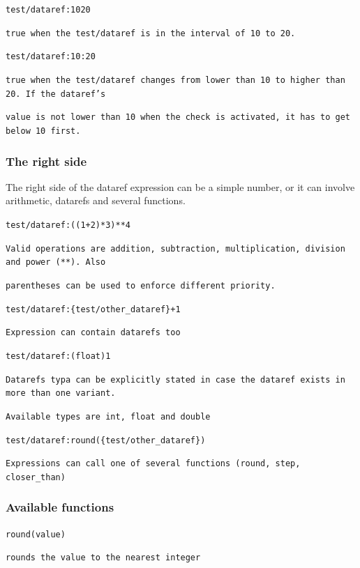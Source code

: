 \documentclass[11pt,parskip=half,a4paper]{scrartcl}
\newcommand\textstyleSourceText[1]{\texttt{#1}}
\begin{document}
\textstyleSourceText{test/dataref:10{\textbar}20}

{\ttfamily
\textstyleSourceText{true when the {\textquotedbl}test/dataref{\textquotedbl} is in the interval of 10 to 20.}}

\textstyleSourceText{test/dataref:10:20}

{\ttfamily
\textstyleSourceText{true when the {\textquotedbl}test/dataref{\textquotedbl} changes from lower than 10 to higher than 20. If the dataref's}}

{\ttfamily
\textstyleSourceText{value is not lower than 10 when the check is activated, it has to get below 10 first.}}

\subsubsection[The right side]{The right side}
The right side of the dataref expression can be a simple number, or it can involve arithmetic, datarefs and several functions.

\textstyleSourceText{test/dataref:((1+2)*3)**4}

{\ttfamily
\textstyleSourceText{Valid operations are addition, subtraction, multiplication, division and power (**). Also}}

{\ttfamily
\textstyleSourceText{parentheses can be used to enforce different priority.}}

\textstyleSourceText{test/dataref:\{test/other\_dataref\}+1}

{\ttfamily
\textstyleSourceText{Expression can contain datarefs too}}

\textstyleSourceText{test/dataref:(float)1}

{\ttfamily
\textstyleSourceText{Datarefs typa can be explicitly stated in case the dataref exists in more than one variant.}}

{\ttfamily
\textstyleSourceText{Available types are int, float and double}}

\textstyleSourceText{test/dataref:round(\{test/other\_dataref\})}

{\ttfamily
\textstyleSourceText{Expressions can call one of several functions (round, step, closer\_than)}}

\subsubsection{Available functions}
\textstyleSourceText{round(value)}

{\ttfamily
\textstyleSourceText{rounds the value to the nearest integer}}
\end{document}
